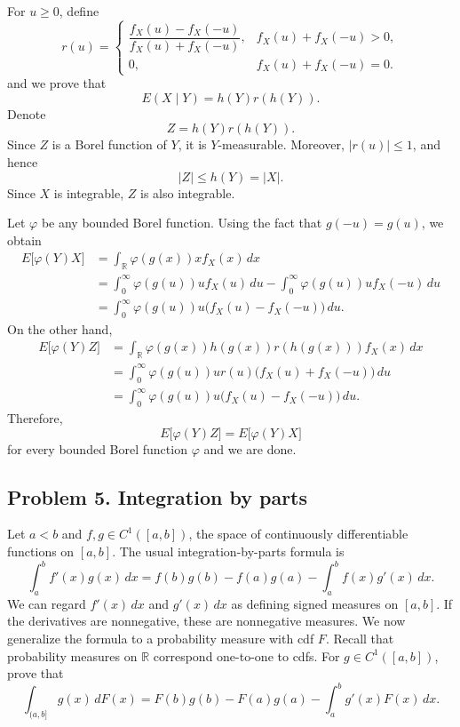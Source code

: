 \documentclass[lang=en,11pt,a4paper,citestyle=authoryear]{elegantpaper}
\newcommand{\R}{\mathbb{R}}
\begin{document}
For $u\geq 0$, define
\[
r(u)=
\begin{cases}
\dfrac{f_X(u)-f_X(-u)}
      {f_X(u)+f_X(-u)},
& f_X(u)+f_X(-u)>0,\\[1.2ex]
0,
& f_X(u)+f_X(-u)=0.
\end{cases}
\]
and we prove that
\[
E(X\mid Y)=h(Y)r(h(Y)).
\]
Denote
\[
Z=h(Y)r(h(Y)).
\]
Since $Z$ is a Borel function of $Y$, it is $Y$-measurable. Moreover,
$|r(u)|\leq 1$, and hence
\[
|Z|\leq h(Y)=|X|.
\]
Since $X$ is integrable, $Z$ is also integrable.

Let $\varphi$ be any bounded Borel function. Using the fact that
$g(-u)=g(u)$, we obtain
\[
\begin{aligned}
E\bigl[\varphi(Y)X\bigr]
&=\int_{\mathbb R}\varphi(g(x))x f_X(x)\,dx\\
&=\int_0^\infty \varphi(g(u))u f_X(u)\,du
  -\int_0^\infty \varphi(g(u))u f_X(-u)\,du\\
&=\int_0^\infty
  \varphi(g(u))u\bigl(f_X(u)-f_X(-u)\bigr)\,du.
\end{aligned}
\]
On the other hand,
\[
\begin{aligned}
E\bigl[\varphi(Y)Z\bigr]
&=\int_{\mathbb R}
  \varphi(g(x))h(g(x))r(h(g(x)))f_X(x)\,dx\\
&=\int_0^\infty
  \varphi(g(u))u r(u)
  \bigl(f_X(u)+f_X(-u)\bigr)\,du\\
&=\int_0^\infty
  \varphi(g(u))u
  \bigl(f_X(u)-f_X(-u)\bigr)\,du.
\end{aligned}
\]
Therefore,
\[
E\bigl[\varphi(Y)Z\bigr]
=
E\bigl[\varphi(Y)X\bigr]
\]
for every bounded Borel function $\varphi$ and we are done.
\vspace{0.5em}


\subsection*{Problem 5. Integration by parts}

Let $a<b$ and $f,g\in C^1([a,b])$, the space of continuously differentiable
functions on $[a,b]$. The usual integration-by-parts formula is
\[
\int_a^b f'(x)g(x)\,dx
=f(b)g(b)-f(a)g(a)-\int_a^b f(x)g'(x)\,dx.
\]
We can regard $f'(x)\,dx$ and $g'(x)\,dx$ as defining signed measures on
$[a,b]$. If the derivatives are nonnegative, these are nonnegative measures.
We now generalize the formula to a probability measure with cdf $F$. Recall
that probability measures on $\R$ correspond one-to-one to cdfs. For
$g\in C^1([a,b])$, prove that
\[
\int_{(a,b]}g(x)\,dF(x)
=F(b)g(b)-F(a)g(a)-\int_a^b g'(x)F(x)\,dx.
\]
\end{document}

